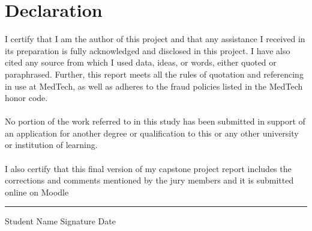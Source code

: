 
\section*{Declaration}

\vspace{1.4cm}
\large \noindent
I certify that I am the author of this project and that any assistance I received in its preparation is fully acknowledged and disclosed in this project. I have also cited any source from which I used data, ideas, or words, either quoted or paraphrased. Further, this report meets all the rules of quotation and referencing in use at MedTech, as well as adheres to the fraud policies listed in the MedTech honor code. \\
\\ No portion of the work referred to in this study has been submitted in support of an application for another degree or qualification to this or any other university or institution of learning. \\
\\  I also certify that this final version of my capstone project report includes the corrections and comments mentioned by the jury members and it is submitted online on Moodle
\normalsize
\vspace{2cm}


\vspace{0.2cm}
\hrule
\vspace{0.2cm}
\noindent Student Name \hspace{7cm} Signature \hspace{3cm} Date